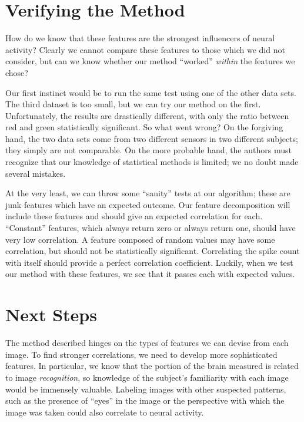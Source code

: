 \documentclass{scrartcl}
\begin{document}
\section{Verifying the Method}

How do we know that these features are the strongest influencers of neural
activity? Clearly we cannot compare these features to those which we did not
consider, but can we know whether our method ``worked'' {\em within} the
features we chose?

Our first instinct would be to run the same test using one of the other data
sets. The third dataset is too small, but we can try our method on the first.
Unfortunately, the results are drastically different, with only the ratio
between red and green statistically significant. So what went wrong? On the
forgiving hand, the two data sets come from two different sensors in two
different subjects; they simply are not comparable. On the more probable hand,
the authors must recognize that our knowledge of statistical methods is
limited; we no doubt made several mistakes.

At the very least, we can throw some ``sanity'' tests at our algorithm; these
are junk features which have an expected outcome. Our feature decomposition
will include these features and should give an expected correlation for each.
``Constant'' features, which always return zero or always return one, should
have very low correlation. A feature composed of random values may have some
correlation, but should not be statistically significant. Correlating the
spike count with itself should provide a perfect correlation coefficient.
Luckily, when we test our method with these features, we see that it passes
each with expected values.

\section{Next Steps}

The method described hinges on the types of features we can devise from each
image. To find stronger correlations, we need to develop more sophisticated
features. In particular, we know that the portion of the brain measured is
related to image {\em recognition}, so knowledge of the subject's familiarity
with each image would be immensely valuable. Labeling images with other
suspected patterns, such as the presence of ``eyes'' in the image or the
perspective with which the image was taken could also correlate to neural
activity.
\end{document}
